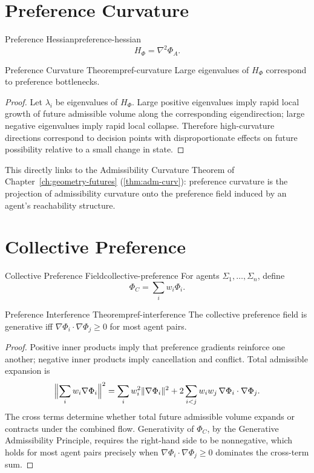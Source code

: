 \documentclass[12pt,twoside,openright]{book}
\begin{document}
\section{Preference Curvature}
\label{sec:ch22-curvature}

\begin{definition}{Preference Hessian}{preference-hessian}
  \[
    H_\Phi = \nabla^2 \Phi_A.
  \]
\end{definition}

\begin{theorem}{Preference Curvature Theorem}{pref-curvature}
  Large eigenvalues of $H_\Phi$ correspond to preference
  bottlenecks.
\end{theorem}

\begin{proof}
  Let $\lambda_i$ be eigenvalues of $H_\Phi$. Large positive
  eigenvalues imply rapid local growth of future admissible
  volume along the corresponding eigendirection; large
  negative eigenvalues imply rapid local collapse.
  Therefore high-curvature directions correspond to decision
  points with disproportionate effects on future possibility
  relative to a small change in state.
\end{proof}

This directly links to the Admissibility Curvature Theorem
of Chapter~\ref{ch:geometry-futures}
(\cref{thm:adm-curv}): preference curvature is the
projection of admissibility curvature onto the preference
field induced by an agent's reachability structure.

\section{Collective Preference}
\label{sec:ch22-collective}

\begin{definition}{Collective Preference Field}{collective-preference}
  For agents $\Sigma_1, \ldots, \Sigma_n$, define
  \[
    \Phi_C = \sum_i w_i \Phi_i.
  \]
\end{definition}

\begin{theorem}{Preference Interference Theorem}{pref-interference}
  The collective preference field is generative iff
  $\nabla\Phi_i \cdot \nabla\Phi_j \ge 0$ for most agent
  pairs.
\end{theorem}

\begin{proof}
  Positive inner products imply that preference gradients
  reinforce one another; negative inner products imply
  cancellation and conflict. Total admissible expansion is
  \[
    \Bigl\|\sum_i w_i \nabla\Phi_i\Bigr\|^2
    = \sum_i w_i^2 \|\nabla\Phi_i\|^2
      + 2\sum_{i<j} w_i w_j\, \nabla\Phi_i \cdot \nabla\Phi_j.
  \]
  The cross terms determine whether total future admissible
  volume expands or contracts under the combined flow.
  Generativity of $\Phi_C$, by the Generative Admissibility
  Principle, requires the right-hand side to be
  nonnegative, which holds for most agent pairs precisely
  when $\nabla\Phi_i \cdot \nabla\Phi_j \ge 0$ dominates the
  cross-term sum.
\end{proof}
\end{document}
